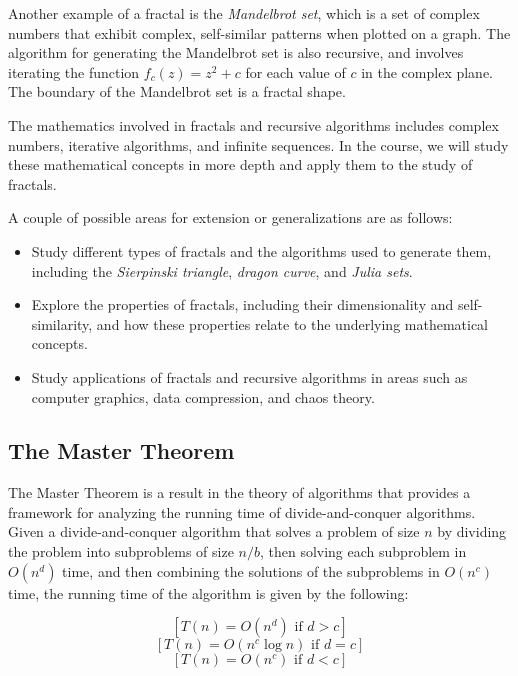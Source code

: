 \documentclass{article}
\begin{document}
    \vspace{3mm}
    Another example of a fractal is the \textit{Mandelbrot set}, which is a set of complex numbers that exhibit complex, self-similar patterns when plotted on a graph. The algorithm for generating the Mandelbrot set is also recursive, and involves iterating the function $f_{c}(z) = z^{2} + c$ for each value of $c$ in the complex plane. The boundary of the Mandelbrot set is a fractal shape.
    
    \vspace{3mm}
    The mathematics involved in fractals and recursive algorithms includes complex numbers, iterative algorithms, and infinite sequences. In the course, we will study these mathematical concepts in more depth and apply them to the study of fractals.
    
    \vspace{3mm}
    A couple of possible areas for extension or generalizations are as follows:
    \begin{itemize}
    \item Study different types of fractals and the algorithms used to generate them, including the \textit{Sierpinski triangle}, \textit{dragon curve}, and \textit{Julia sets}.
    \item Explore the properties of fractals, including their dimensionality and self-similarity, and how these properties relate to the underlying mathematical concepts.
    \item Study applications of fractals and recursive algorithms in areas such as computer graphics, data compression, and chaos theory.
    \end{itemize}

\pagebreak

\subsection*{The Master Theorem}
    The Master Theorem is a result in the theory of algorithms that provides a framework for analyzing the running time of divide-and-conquer algorithms. Given a divide-and-conquer algorithm that solves a problem of size $n$ by dividing the problem into subproblems of size $n/b$, then solving each subproblem in $O(n^d)$ time, and then combining the solutions of the subproblems in $O(n^c)$ time, the running time of the algorithm is given by the following:
        
    $$[T(n) = O(n^d)\text{ if }d > c]$$
    $$[T(n) = O(n^c \log n)\text{ if }d = c]$$
    $$[T(n) = O(n^c)\text{ if }d < c]$$
    
\end{document}
